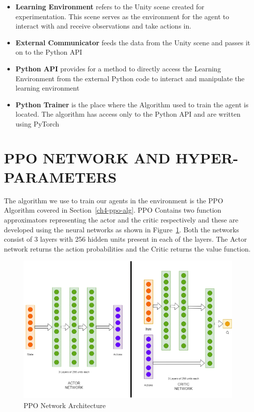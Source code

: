 \begin{itemize}
\item \textbf{Learning Environment} refers to the Unity scene created
  for experimentation. This scene serves as the environment for the
  agent to interact with and receive observations and take actions in.
\item \textbf{External Communicator} feeds the data from the Unity
  scene and passes it on to the Python API
\item \textbf{Python API} provides for a method to directly access
  the Learning Environment from the external Python code to interact
  and manipulate the learning environment
\item \textbf{Python Trainer} is the place where the Algorithm used
  to train the agent is located. The algorithm has access only to the
  Python API and are written using PyTorch \cite{Pytorch}
\end{itemize}

\section{PPO NETWORK AND HYPER-PARAMETERS}

The algorithm we use to train our agents in the environment is the PPO
Algorithm covered in Section~\ref{ch4-ppo-alg}. PPO Contains two
function approximators representing the actor and the critic
respectively and these are developed using the neural networks as
shown in Figure~\ref{fig:ppo-network}. Both the networks consist of 3
layers with 256 hidden units present in each of the layers. The Actor
network returns the action probabilities and the Critic returns the
value function.

\begin{figure}[H]
    \centering
    \includegraphics[width=1.0\textwidth]{images/ppo-network-v2.png}
    \caption{PPO Network Architecture}
    \label{fig:ppo-network}
\end{figure}

